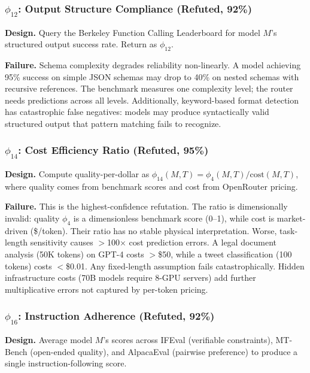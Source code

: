 \subsubsection{$\phi_{12}$: Output Structure Compliance (Refuted, 92\%)}

\textbf{Design.} Query the Berkeley Function Calling Leaderboard for model $M$'s structured output success rate. Return as $\phi_{12}$.

\textbf{Failure.} Schema complexity degrades reliability non-linearly. A model achieving 95\% success on simple JSON schemas may drop to 40\% on nested schemas with recursive references. The benchmark measures one complexity level; the router needs predictions across all levels. Additionally, keyword-based format detection has catastrophic false negatives: models may produce syntactically valid structured output that pattern matching fails to recognize.

\subsubsection{$\phi_{14}$: Cost Efficiency Ratio (Refuted, 95\%)}

\textbf{Design.} Compute quality-per-dollar as $\phi_{14}(M,T) = \phi_4(M,T) / \text{cost}(M,T)$, where quality comes from benchmark scores and cost from OpenRouter pricing.

\textbf{Failure.} This is the highest-confidence refutation. The ratio is dimensionally invalid: quality $\phi_4$ is a dimensionless benchmark score (0--1), while cost is market-driven (\$/token). Their ratio has no stable physical interpretation. Worse, task-length sensitivity causes $>$100$\times$ cost prediction errors. A legal document analysis (50K tokens) on GPT-4 costs $>$\$50, while a tweet classification (100 tokens) costs $<$\$0.01. Any fixed-length assumption fails catastrophically. Hidden infrastructure costs (70B models require 8-GPU servers) add further multiplicative errors not captured by per-token pricing.

\subsubsection{$\phi_{16}$: Instruction Adherence (Refuted, 92\%)}

\textbf{Design.} Average model $M$'s scores across IFEval (verifiable constraints), MT-Bench (open-ended quality), and AlpacaEval (pairwise preference) to produce a single instruction-following score.


